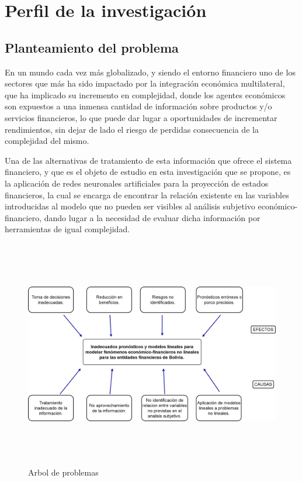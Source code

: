 \documentclass[
  12pt,
]{article}
\author{}
\date{\vspace{-2.5em}}
\begin{document}


\newpage
\tableofcontents
\listoffigures
\listoftables

\newpage

\hypertarget{perfil-de-la-investigaciuxf3n}{%
\section{Perfil de la
investigación}\label{perfil-de-la-investigaciuxf3n}}

\hypertarget{planteamiento-del-problema}{%
\subsection{Planteamiento del
problema}\label{planteamiento-del-problema}}

En un mundo cada vez más globalizado, y siendo el entorno financiero uno
de los sectores que más ha sido impactado por la integración económica
multilateral, que ha implicado su incremento en complejidad, donde los
agentes económicos son expuestos a una inmensa cantidad de información
sobre productos y/o servicios financieros, lo que puede dar lugar a
oportunidades de incrementar rendimientos, sin dejar de lado el riesgo
de perdidas consecuencia de la complejidad del mismo.

Una de las alternativas de tratamiento de esta información que ofrece el
sistema financiero, y que es el objeto de estudio en esta investigación
que se propone, es la aplicación de redes neuronales artificiales para
la proyección de estados financieros, la cual se encarga de encontrar la
relación existente en las variables introducidas al modelo que no pueden
ser visibles al análisis subjetivo económico-financiero, dando lugar a
la necesidad de evaluar dicha información por herramientas de igual
complejidad.

\begin{figure}[h!]
\centering
\includegraphics[width=15cm, height=10cm]{RECURSOS-INVESTIGACION/001-PERFIL-DEL-PROYECTO/arbol-de-problemas.png}
\caption{Arbol de problemas}
\end{figure}
\end{document}
